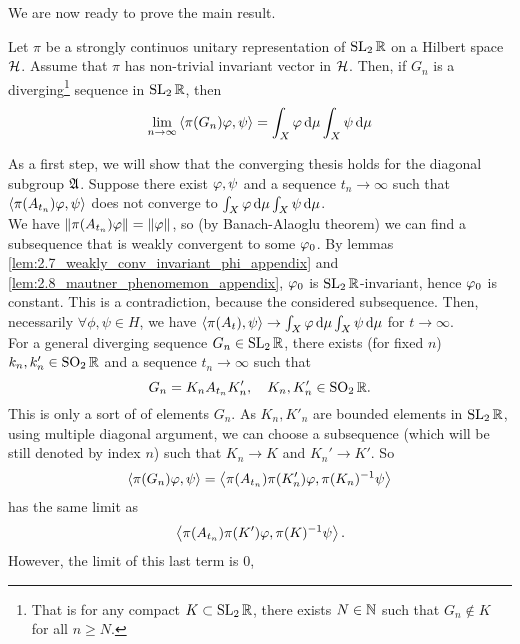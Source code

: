 We are now ready to prove the main result.

\begin{nteo}
\label{teo:mixing_flow_psl2_appendix}
Let $\pi$ be a strongly continuos unitary representation of $\operatorname{SL}_{2}\mathbb{R}$ on a Hilbert space $\mathcal{H}$. Assume that $\pi$ has non-trivial invariant vector in $\mathcal{H}$. Then, if $G_{n}$ is a diverging\footnote{That is for any compact $K\subset \operatorname{SL}_{2}\mathbb{R}$, there exists $N\in\mathbb{N}$ such that $G_{n}\not\in K$ for all $n\geq N$.} sequence in $\operatorname{SL}_{2}\mathbb{R}$, then 
\[
\lim_{n\to\infty}\left< \pi(G_{n})\varphi,\psi\right>=\int_{X}\varphi\mathop{}\!\mathrm{d}\mu\int_{X}\psi\mathop{}\!\mathrm{d}\mu
\]
\end{nteo}
\begin{prf}
As a first step, we will show that the converging thesis holds for the diagonal subgroup $\mathfrak{A}$. Suppose there exist $\varphi,\psi$ and a sequence $t_{n}\to\infty$ such that $ \left< \pi(A_{t_{n}})\varphi,\psi\right>$ does not converge to $\int_{X}\varphi\mathop{}\!\mathrm{d}\mu\int_{X}\psi\mathop{}\!\mathrm{d}\mu$.\\
We have $\left\lVert \pi(A_{t_{n}})\varphi\right\rVert=\left\lVert \varphi\right\rVert$, so (by Banach-Alaoglu theorem) we can find a subsequence that is weakly convergent to some $\varphi_{0}$. By lemmas \ref{lem:2.7_weakly_conv_invariant_phi_appendix} and \ref{lem:2.8_mautner_phenomemon_appendix}, $\varphi_{0}$ is $\operatorname{SL}_{2}\mathbb{R}$-invariant, hence $\varphi_{0}$ is constant. This is a contradiction, because  the considered subsequence. Then, necessarily $\forall\phi,\psi\in H$, we have $\left< \pi(A_{t}),\psi\right>\to\int_{X}\varphi\mathop{}\!\mathrm{d}\mu\int_{X}\psi\mathop{}\!\mathrm{d}\mu$ for $t\to\infty$.\\
For a general diverging sequence $G_{n}\in\operatorname{SL}_{2}\mathbb{R}$, there exists (for fixed $n$) $k_{n},k'_{n}\in\operatorname{SO}_{2}\mathbb{R}$ and a sequence $t_{n}\to\infty$ such that 
\[
G_{n}=K_{n}A_{t_{n}}K'_{n},\quad K_{n}, K_{n}'\in\operatorname{SO}_{2}\mathbb{R}.
\]
This is only a sort of  of elements $G_{n}$. As $K_{n},K'_{n}$ are bounded elements in $\operatorname{SL}_{2}\mathbb{R}$, using multiple diagonal argument, we can choose a subsequence (which will be still denoted by index $n$) such that $K_{n}\to K$ and $K_{n}'\to K'$. So
\[
\left< \pi(G_{n})\varphi,\psi\right>=\left< \pi(A_{t_{n}})\pi(K_{n}')\varphi,\pi(K_{n})^{-1}\psi\right>
\]
has the same limit as
\[
\left< \pi(A_{t_{n}})\pi(K')\varphi,\pi(K)^{-1}\psi\right>.
\]
However, the limit of this last term is $0$,

\end{prf}

